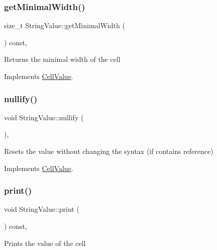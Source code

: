 \subsubsection{\texorpdfstring{get\+Minimal\+Width()}{getMinimalWidth()}}
{\footnotesize\ttfamily size\+\_\+t String\+Value\+::get\+Minimal\+Width (\begin{DoxyParamCaption}{ }\end{DoxyParamCaption}) const\hspace{0.3cm}{\ttfamily [override]}, {\ttfamily [virtual]}}

Returns the minimal width of the cell 

Implements \hyperlink{classCellValue_ad96473ba3dd88b83da96c03ae31a2ede}{Cell\+Value}.

\mbox{\label{classStringValue_a949dd5939db253c347ce8936b0c5f368}} 
\subsubsection{\texorpdfstring{nullify()}{nullify()}}
{\footnotesize\ttfamily void String\+Value\+::nullify (\begin{DoxyParamCaption}{ }\end{DoxyParamCaption})\hspace{0.3cm}{\ttfamily [override]}, {\ttfamily [virtual]}}

Resets the value without changing the syntax (if contains reference) 

Implements \hyperlink{classCellValue_af4f30a4b36e159f2f2bfc7ed83f1b37a}{Cell\+Value}.

\mbox{\label{classStringValue_a2b7b078d04a0c9994013adb0cc3e699a}} 
\subsubsection{\texorpdfstring{print()}{print()}}
{\footnotesize\ttfamily void String\+Value\+::print (\begin{DoxyParamCaption}{ }\end{DoxyParamCaption}) const\hspace{0.3cm}{\ttfamily [override]}, {\ttfamily [virtual]}}

Prints the value of the cell 


